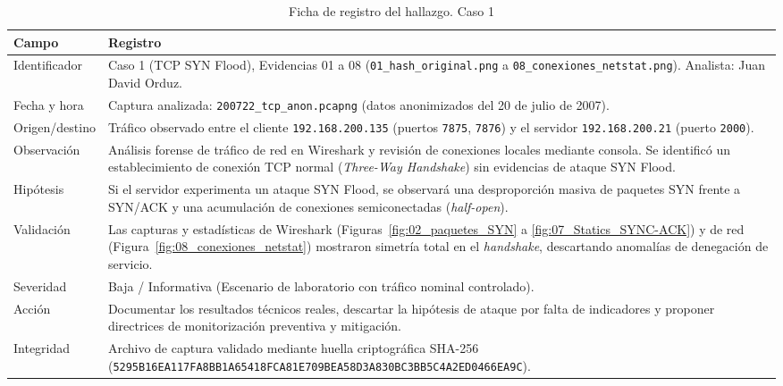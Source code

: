 \begin{table}[H]
    \centering
    \caption{Ficha de registro del hallazgo. Caso 1}
    \footnotesize
    \renewcommand{\arraystretch}{1.2}
    \begin{tabularx}{\textwidth}{@{}>{\raggedright\arraybackslash}p{} Y@{}}
        \toprule
        \textbf{Campo} & \textbf{Registro} \\
        \midrule
        Identificador & Caso 1 (TCP SYN Flood), Evidencias 01 a 08 (\texttt{01\_hash\_original.png} a \texttt{08\_conexiones\_netstat.png}). Analista: Juan David Orduz. \\ \hline
        Fecha y hora & Captura analizada: \texttt{200722\_tcp\_anon.pcapng} (datos anonimizados del 20 de julio de 2007). \\ \hline
        Origen/destino & Tráfico observado entre el cliente \texttt{192.168.200.135} (puertos \texttt{7875}, \texttt{7876}) y el servidor \texttt{192.168.200.21} (puerto \texttt{2000}). \\ \hline
        Observación & Análisis forense de tráfico de red en Wireshark y revisión de conexiones locales mediante consola. Se identificó un establecimiento de conexión TCP normal (\textit{Three-Way Handshake}) sin evidencias de ataque SYN Flood. \\ \hline
        Hipótesis & Si el servidor experimenta un ataque SYN Flood, se observará una desproporción masiva de paquetes SYN frente a SYN/ACK y una acumulación de conexiones semiconectadas (\textit{half-open}). \\ \hline
        Validación & Las capturas y estadísticas de Wireshark (Figuras~\ref{fig:02_paquetes_SYN} a \ref{fig:07_Statics_SYNC-ACK}) y de red (Figura~\ref{fig:08_conexiones_netstat}) mostraron simetría total en el \textit{handshake}, descartando anomalías de denegación de servicio. \\ \hline
        Severidad & Baja / Informativa (Escenario de laboratorio con tráfico nominal controlado). \\ \hline
        Acción & Documentar los resultados técnicos reales, descartar la hipótesis de ataque por falta de indicadores y proponer directrices de monitorización preventiva y mitigación. \\ \hline
        Integridad & Archivo de captura validado mediante huella criptográfica SHA-256 (\texttt{5295B16EA117FA8BB1A65418FCA81E709BEA58D3A830BC3BB5C4A2ED0466EA9C}). \\
        \bottomrule
    \end{tabularx}
\end{table}